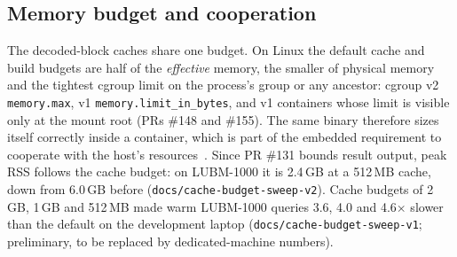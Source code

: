 \documentclass[sigconf, nonacm]{acmart}
\begin{document}
\subsection{Memory budget and cooperation}
The decoded-block caches share one budget. On Linux the default cache and build budgets are half of the \emph{effective} memory, the smaller of physical memory and the tightest cgroup limit on the process's group or any ancestor: cgroup v2 \texttt{memory.max}, v1 \texttt{memory.limit\_in\_bytes}, and v1 containers whose limit is visible only at the mount root (PRs \#148 and \#155). The same binary therefore sizes itself correctly inside a container, which is part of the embedded requirement to cooperate with the host's resources~\cite{raasveldt2020}. Since PR \#131 bounds result output, peak RSS follows the cache budget: on LUBM-1000 it is 2.4\,GB at a 512\,MB cache, down from 6.0\,GB before (\texttt{docs/cache-budget-sweep-v2}). Cache budgets of 2\,GB, 1\,GB and 512\,MB made warm LUBM-1000 queries 3.6, 4.0 and 4.6$\times$ slower than the default on the development laptop (\texttt{docs/cache-budget-sweep-v1}; preliminary, to be replaced by dedicated-machine numbers).
\end{document}
